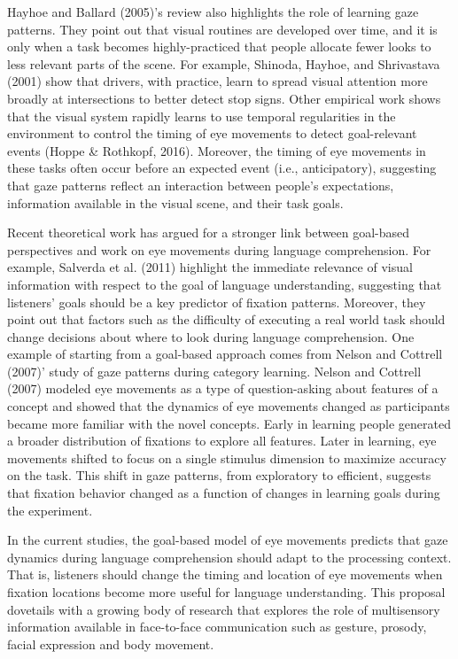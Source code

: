 \documentclass[english,floatsintext,man]{apa6}
\begin{document}
Hayhoe and Ballard (2005)'s review also highlights the role of learning
gaze patterns. They point out that visual routines are developed over
time, and it is only when a task becomes highly-practiced that people
allocate fewer looks to less relevant parts of the scene. For example,
Shinoda, Hayhoe, and Shrivastava (2001) show that drivers, with
practice, learn to spread visual attention more broadly at intersections
to better detect stop signs. Other empirical work shows that the visual
system rapidly learns to use temporal regularities in the environment to
control the timing of eye movements to detect goal-relevant events
(Hoppe \& Rothkopf, 2016). Moreover, the timing of eye movements in
these tasks often occur before an expected event (i.e., anticipatory),
suggesting that gaze patterns reflect an interaction between people's
expectations, information available in the visual scene, and their task
goals.

Recent theoretical work has argued for a stronger link between
goal-based perspectives and work on eye movements during language
comprehension. For example, Salverda et al. (2011) highlight the
immediate relevance of visual information with respect to the goal of
language understanding, suggesting that listeners' goals should be a key
predictor of fixation patterns. Moreover, they point out that factors
such as the difficulty of executing a real world task should change
decisions about where to look during language comprehension. One example
of starting from a goal-based approach comes from Nelson and Cottrell
(2007)' study of gaze patterns during category learning. Nelson and
Cottrell (2007) modeled eye movements as a type of question-asking about
features of a concept and showed that the dynamics of eye movements
changed as participants became more familiar with the novel concepts.
Early in learning people generated a broader distribution of fixations
to explore all features. Later in learning, eye movements shifted to
focus on a single stimulus dimension to maximize accuracy on the task.
This shift in gaze patterns, from exploratory to efficient, suggests
that fixation behavior changed as a function of changes in learning
goals during the experiment.

In the current studies, the goal-based model of eye movements predicts
that gaze dynamics during language comprehension should adapt to the
processing context. That is, listeners should change the timing and
location of eye movements when fixation locations become more useful for
language understanding. This proposal dovetails with a growing body of
research that explores the role of multisensory information available in
face-to-face communication such as gesture, prosody, facial expression
and body movement.
\end{document}

